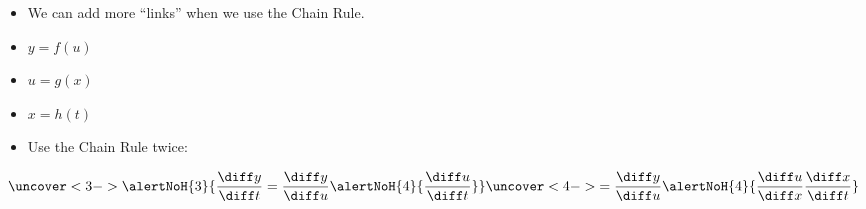 \begin{frame}
\begin{itemize}
\item  We can add more ``links'' when we use the Chain Rule.
\item<2-| alert@3>  $y = f(u)$
\item<2-| alert@4>  $u = g(x)$
\item<2-| alert@4>  $x = h(t)$
\item<3->  Use the Chain Rule twice:
\end{itemize}
\[
\uncover<3->{%
\alertNoH{ 3}{\frac{\diff y}{\diff t} = \frac{\diff y}{\diff u}\alertNoH{ 4}{\frac{\diff u}{\diff t}}}%
}%
\uncover<4->{%
 = \frac{\diff y}{\diff u}\alertNoH{ 4}{\frac{\diff u}{\diff x}\frac{\diff x}{\diff t}}%
}%
\]
\end{frame}
